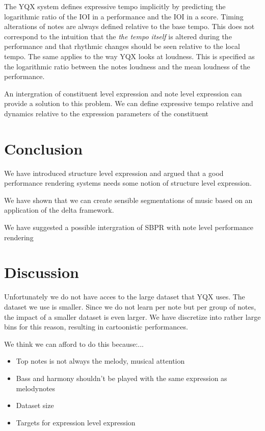 \documentclass[a4paper,10pt]{article}
\begin{document}
The YQX system defines expressive tempo implicitly by predicting the logarithmic ratio of the IOI in a performance and the IOI in a score. Timing alterations of notes are always defined relative to the base tempo. This does not correspond to the intuition that the \textit{the tempo itself} is altered during the performance and that rhythmic changes should be seen relative to the local tempo. The same applies to the way YQX looks at loudness. This is specified as the logarithmic ratio between the notes loudness and the mean loudness of the performance. 

An intergration of constituent level expression and note level expression can provide a solution to this problem. We can define expressive tempo relative and dynamics relative to the expression parameters of the constituent

\section{Conclusion}
We have introduced structure level expression and argued that a good performance rendering systems needs some notion of structure level expression. 

We have shown that we can create sensible segmentations of music based on an application of the delta framework. \cite{markwin} 

We have suggested a possible intergration of SBPR with note level performance rendering
\section{Discussion}

Unfortunately we do not have acces to the large dataset that YQX uses. The dataset we use is smaller. Since we do not learn per note but per group of notes, the impact of a smaller dataset is even larger. We have discretize into rather large bins for this reason, resulting in cartoonistic performances. 

We think we can afford to do this because:...

\begin{itemize}
\item Top notes is not always the melody, musical attention
\item Bass and harmony shouldn't be played with the same expression as melodynotes
\item Dataset size
\item Targets for expression level expression
\end{itemize}
\end{document}
